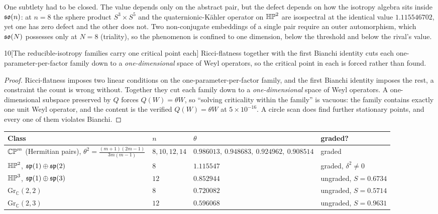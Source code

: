 One subtlety had to be closed. The value depends only on the abstract pair, but the defect depends on how the isotropy algebra sits inside $\mathfrak{so}(n)$: at $n=8$ the sphere product $S^3\times S^5$ and the quaternionic-K\"ahler operator on $\mathbb{HP}^2$ are isospectral at the identical value $1.115546702$, yet one has zero defect and the other does not. Two non-conjugate embeddings of a single pair require an outer automorphism, which $\mathfrak{so}(N)$ possesses only at $N=8$ (triality), so the phenomenon is confined to one dimension, below the threshold and below the rival's value.

\begin{Lem}{10}[The reducible-isotropy families carry one critical point each]
Ricci-flatness together with the first Bianchi identity cuts each one-parameter-per-factor family down to a \emph{one-dimensional} space of Weyl operators, so the critical point in each is forced rather than found.
\end{Lem}

\begin{proof}
Ricci-flatness imposes two linear conditions on the one-parameter-per-factor family, and the first Bianchi identity imposes the rest, a constraint the count is wrong without. Together they cut each family down to a \emph{one-dimensional} space of Weyl operators. A one-dimensional subspace preserved by $Q$ forces $Q(W)=\theta W$, so ``solving criticality within the family'' is vacuous: the family contains exactly one unit Weyl operator, and the content is the verified $Q(W)=\theta W$ at $5\times10^{-16}$. A circle scan does find further stationary points, and every one of them violates Bianchi.
\end{proof}

\begin{center}
\begin{tabular}{@{}llll@{}}
\toprule
Class & $n$ & $\theta$ & graded? \\
\midrule
$\mathbb{CP}^m$ (Hermitian pairs), $\theta^2=\tfrac{(m+1)(2m-1)}{3m(m-1)}$ & $8,10,12,14$ & $0.986013,\ 0.948683,\ 0.924962,\ 0.908514$ & graded \\
$\mathbb{HP}^2$, $\mathfrak{sp}(1)\oplus\mathfrak{sp}(2)$ & $8$ & $1.115547$ & graded, $\delta^2\ne0$ \\
$\mathbb{HP}^3$, $\mathfrak{sp}(1)\oplus\mathfrak{sp}(3)$ & $12$ & $0.852944$ & ungraded, $S=0.6734$ \\
$\mathrm{Gr}_{\mathbb C}(2,2)$ & $8$ & $0.720082$ & ungraded, $S=0.5714$ \\
$\mathrm{Gr}_{\mathbb C}(2,3)$ & $12$ & $0.596068$ & ungraded, $S=0.9631$ \\
\bottomrule
\end{tabular}
\end{center}

